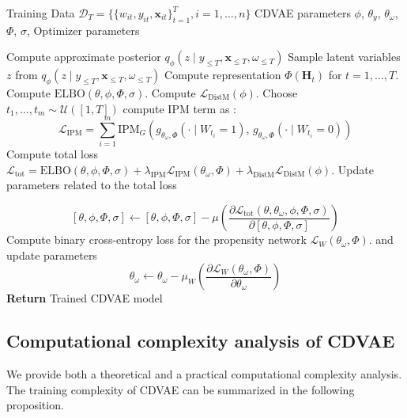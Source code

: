 \documentclass[10pt]{article} %
\begin{document}
\begin{algorithm}
\caption{Pseudo-code for training CDVAE}
\label{alg:cdvae_training}
\begin{algorithmic}[1]
\Require Training Data $\mathcal{D}_T = \{\{w_{it}, y_{it}, \mathbf{x}_{it}\}_{t=1}^{T}, i=1,\dots,n\}$
\Require CDVAE parameters $\phi$, $\theta_y$, $\theta_{\omega}$, $\Phi$, $\sigma$, Optimizer parameters

        \State Compute approximate posterior $q_\phi(z \mid y_{\leq T}, \mathbf{x}_{\leq T}, \omega_{\leq T})$
        \State Sample latent variables $z$ from $q_\phi(z \mid y_{\leq T}, \mathbf{x}_{\leq T}, \omega_{\leq T})$
        \State Compute representation \(\Phi(\mathbf{H}_t)\) for \(t=1,\dots, T\).
        \State Compute \(\mathrm{ELBO}(\theta, \phi, \Phi, \sigma)\).
        \State Compute \(\mathcal{L}_{\mathrm{DistM}}(\phi)\).
        \State Choose $t_{1}, \dots, t_{m} \sim \mathcal{U}([1, T]) $ compute IPM term as :
    \[
        \mathcal{L}_{\mathrm{IPM}} = \sum_{i=1}^m \mathrm{IPM}_{G} \left( g_{\theta_{\omega}, \Phi}(\cdot \mid W_{t_i} = 1), \, g_{\theta_{\omega}, \Phi}(\cdot \mid W_{t_i} = 0)\right)
        \]
        \State Compute total loss \( \mathcal{L}_{\mathrm{tot}} = \mathrm{ELBO}(\theta, \phi, \Phi, \sigma) + \lambda_{\mathrm{IPM}} \mathcal{L}_{\mathrm{IPM}}(\theta_{\omega}, \Phi) + \lambda_{\mathrm{DistM}} \mathcal{L}_{\mathrm{DistM}}(\phi).\)
        \State Update parameters related to the total loss
    
        $$[\theta, \phi, \Phi, \sigma] \leftarrow  [\theta, \phi, \Phi, \sigma ]- \mu  \left( \frac{\partial \mathcal{L}_{\mathrm{tot}}(\theta, \theta_{\omega}, \phi, \Phi, \sigma)}{\partial [\theta, \phi, \Phi, \sigma] }  \right  ) $$
        \State Compute binary cross-entropy loss for the propensity network \(\mathcal{L}_{W}(\theta_{\omega}, \Phi).\) and update parameters
        $$\theta_{\omega}  \leftarrow  \theta_{\omega} - \mu_{W}  \left( \frac{\partial  \mathcal{L}_{W}(\theta_{\omega}, \Phi)}{\partial \theta_{\omega}}  \right  ) $$
    \EndFor
\EndFor
\State \textbf{Return} Trained CDVAE model
\end{algorithmic}
\end{algorithm}

\subsection{Computational complexity analysis of CDVAE}
\label{appendix:complexity_analysis_cdvae}
We provide both a theoretical and a practical computational complexity analysis. 
The training complexity of CDVAE can be summarized in the following proposition.
\end{document}
